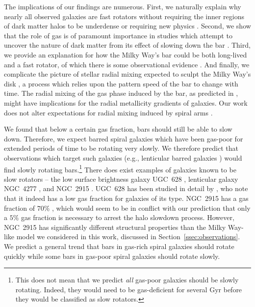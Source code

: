 \documentclass[twocolumn,linenumbers,trackchanges]{aastex631}
\begin{document}
The implications of our findings are numerous. First, we naturally explain why
nearly all observed galaxies are fast rotators without requiring the inner
regions of dark matter halos to be underdense \citep{1998ApJ...493L...5D,
2000ApJ...543..704D} or requiring new physics \citep{2021MNRAS.503.2833R,
2021MNRAS.508..926R}. Second, we show that the role of gas is of paramount
importance in studies which attempt to uncover the nature of dark matter from
its effect of slowing down the bar \citep{2021MNRAS.500.4710C,
2021MNRAS.505.2412C}. Third, we provide an explanation for how the Milky Way's
bar could be both long-lived and a fast rotator, of which there is some
observational evidence \citep{2019MNRAS.490.4740B}. And finally, we complicate
the picture of stellar radial mixing expected to sculpt the Milky Way's
disk \citep{2012MNRAS.420..913B, 2015ApJ...808..132H}, a process which relies
upon the pattern speed of the bar to change with time. The radial mixing of
the gas phase induced by the bar, as predicted in \citet{2011MNRAS.415.1027H},
might have implications for the radial metallicity gradients of galaxies. Our
work does not alter expectations for radial mixing induced by spiral arms
\citep{2002MNRAS.336..785S}.

We found that below a certain gas fraction, bars should still be able to slow
down. Therefore, we expect barred spiral galaxies which have been gas-poor for
extended periods of time to be rotating very slowly. We therefore predict that
observations which target such galaxies (e.g., lenticular barred galaxies
\citep{2009ARAA..47..159B}) would find slowly rotating bars.\footnote{This does
not mean that we predict \textit{all} gas-poor galaxies should be slowly
rotating. Indeed, they would need to be gas-deficient for several $\textrm{Gyr}$
before they would be classified as slow rotators.} There does exist
examples of galaxies known to be slow rotators -- the low surface brightness
galaxy UGC~628 \citep{2009AA...499L..25C}, lenticular galaxy NGC~4277
\citep{2022AA...664L..10B}, and NGC~2915 \citep{1999AJ....118.2158B}. UGC~628
has been studied in detail by \citet{2016MNRAS.463.1751C}, who note that it
indeed has a low gas fraction for galaxies of its type. NGC~2915 has a gas
fraction of $70\%$ \citep{2010ApJ...715..656W}, which would seem to be in
conflict with our prediction that only a $5\%$ gas fraction is necessary to
arrest the halo slowdown process. However, NGC~2915 has significantly different
structural properties than the Milky Way-like model we considered in this work,
discussed in Section~\ref{ssec:observations}. We predict a general trend that
bars in gas-rich spiral galaxies should rotate quickly while some bars in
gas-poor spiral galaxies should rotate slowly.
\end{document}
